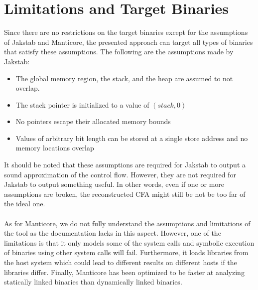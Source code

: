 \documentclass{kththesis}
\newcommand{\fbcomment}[1]{{#1}}
\renewcommand{\fbcomment}[1]{}
\begin{document}
\section{Limitations and Target Binaries}
\fbcomment{\color{red}Goal: Describe what assumptions are required for Jakstab and Manticore to work as expected.}
%
%
%
%
Since there are no restrictions on the target binaries except for the assumptions of Jakstab and Manticore, the presented approach can target all types of binaries that satisfy these assumptions. The following are the assumptions made by Jakstab:
\begin{itemize}
    \item The global memory region, the stack, and the heap are assumed to not overlap.
    \item The stack pointer is initialized to a value of $(stack,0)$
    \item No pointers escape their allocated memory bounds
    \item Values of arbitrary bit length can be stored at a single store address and no memory locations overlap
\end{itemize}
It should be noted that these assumptions are required for Jakstab to output a sound approximation of the control flow. However, they are not required for Jakstab to output something useful. In other words, even if one or more assumptions are broken, the reconstructed CFA might still be not be too far of the ideal one. 
\\ \\
As for Manticore, we do not fully understand the assumptions and limitations of the tool as the documentation lacks in this aspect. However, one of the limitations is that it only models some of the system calls and symbolic execution of binaries using other system calls will fail\cite{feliam}. Furthermore, it loads libraries from the host system which could lead to different results on different hosts if the libraries differ\cite{feliam}. Finally, Manticore has been optimized to be faster at analyzing statically linked binaries than dynamically linked binaries\cite{feliam}. 
\end{document}
